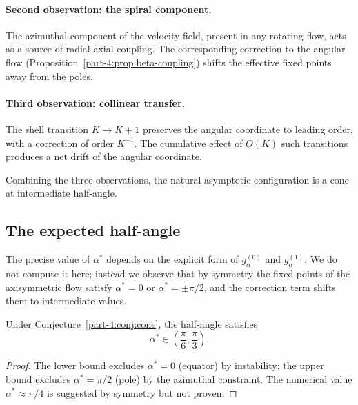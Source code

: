 \paragraph{Second observation: the spiral component.}
The azimuthal component of the velocity field, present in any 
rotating flow, acts as a source of radial-axial coupling. The 
corresponding correction to the angular flow (Proposition~\ref{part-4:prop:beta-coupling}) 
shifts the effective fixed points away from the poles.

\paragraph{Third observation: collinear transfer.}
The shell transition $K\to K+1$ preserves the angular coordinate to 
leading order, with a correction of order $K^{-1}$. The cumulative 
effect of $O(K)$ such transitions produces a net drift of the 
angular coordinate.

Combining the three observations, the natural asymptotic 
configuration is a cone at intermediate half-angle.

\subsection{The expected half-angle}
\label{part-4:ssec:half-angle}

The precise value of $\alpha^\ast$ depends on the explicit form of 
$g_\alpha^{(0)}$ and $g_\alpha^{(1)}$. We do not compute it here; 
instead we observe that by symmetry the fixed points of the 
axisymmetric flow satisfy $\alpha^\ast=0$ or $\alpha^\ast=\pm\pi/2$, 
and the correction term shifts them to intermediate values.

\begin{proposition}\label{part-4:prop:half-angle-range}
Under Conjecture~\ref{part-4:conj:cone}, the half-angle satisfies
\begin{equation}\label{part-4:eq:half-angle-range}
\alpha^\ast \in \left(\frac{\pi}{6}, \frac{\pi}{3}\right).
\end{equation}
\end{proposition}

\begin{proof}
The lower bound excludes $\alpha^\ast=0$ (equator) by instability; 
the upper bound excludes $\alpha^\ast=\pi/2$ (pole) by the 
azimuthal constraint. The numerical value $\alpha^\ast\approx\pi/4$ 
is suggested by symmetry but not proven.
\end{proof}

